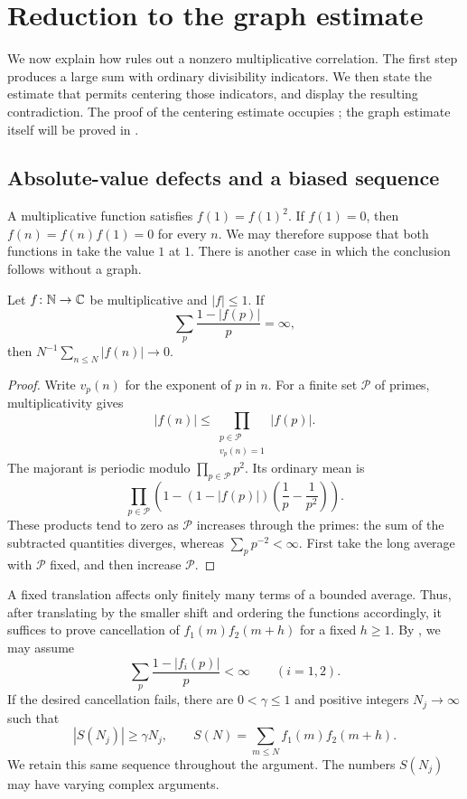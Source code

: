 \section{Reduction to the graph estimate}\label{sec:analytic-transfer}

We now explain how  rules out a nonzero
multiplicative correlation. The first step produces a large sum with
ordinary divisibility indicators. We then state the estimate that permits
centering those indicators, and display the resulting contradiction.
The proof of the centering estimate occupies
; the graph estimate itself will be proved
in .

\subsection{Absolute-value defects and a biased sequence}

A multiplicative function satisfies $f(1)=f(1)^2$. If $f(1)=0$, then
$f(n)=f(n)f(1)=0$ for every $n$. We may therefore suppose that both
functions in  take the value $1$ at $1$.
There is another case in which the conclusion follows without a graph.

\begin{lemma}\label{lem:analytic-absolute-defect}
Let $f\colon\mathbb N\to\mathbb C$ be multiplicative and $|f|\le1$. If
\[
 \sum_p\frac{1-|f(p)|}{p}=\infty,
\]
then $N^{-1}\sum_{n\le N}|f(n)|\to0$.
\end{lemma}
\begin{proof}
Write $v_p(n)$ for the exponent of $p$ in $n$. For a finite set
$\mathcal P$ of primes, multiplicativity gives
\[
 |f(n)|\le
 \prod_{\substack{p\in\mathcal P\\v_p(n)=1}}|f(p)|.
\]
The majorant is periodic modulo $\prod_{p\in\mathcal P}p^2$.
Its ordinary mean is
\[
 \prod_{p\in\mathcal P}
 \left(1-(1-|f(p)|)\left(\frac1p-\frac1{p^2}\right)\right).
\]
These products tend to zero as $\mathcal P$ increases through the primes:
the sum of the subtracted quantities diverges, whereas
$\sum_p p^{-2}<\infty$. First take the long average with $\mathcal P$
fixed, and then increase $\mathcal P$.
\end{proof}

A fixed translation affects only finitely many terms of a bounded
average. Thus, after translating by the smaller shift and ordering the
functions accordingly, it suffices to prove cancellation of
$f_1(m)f_2(m+h)$ for a fixed $h\ge1$.
By , we may assume
\begin{equation}\label{eq:analytic-finite-defects}
 \sum_p\frac{1-|f_i(p)|}{p}<\infty\qquad(i=1,2).
\end{equation}
If the desired cancellation fails, there are $0<\gamma\le1$ and positive
integers $N_j\to\infty$ such that
\begin{equation}\label{eq:analytic-bias}
 \left|S(N_j)\right|\ge\gamma N_j,
 \qquad S(N)=\sum_{m\le N}f_1(m)f_2(m+h).
\end{equation}
We retain this same sequence throughout the argument.
The numbers $S(N_j)$ may have varying complex arguments.

